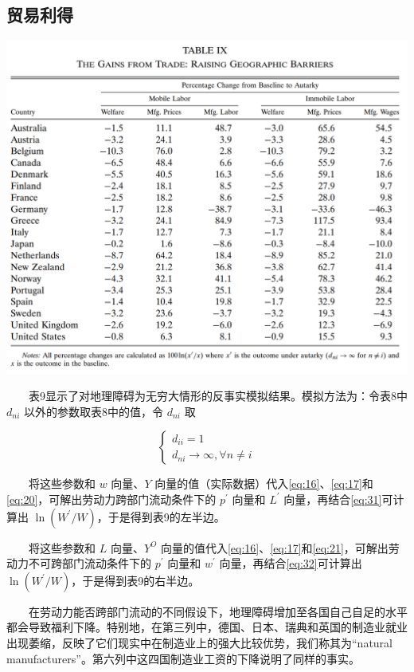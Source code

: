 \documentclass[]{article}
\begin{document}
\hypertarget{section-27}{%
\subsection{贸易利得}\label{section-27}}

\begin{center}\includegraphics[width=1\linewidth]{Figures/Table9} \end{center}

　　表9显示了对地理障碍为无穷大情形的反事实模拟结果。模拟方法为：令表8中 \(d_{ni}\) 以外的参数取表8中的值，令 \(d_{ni}\) 取

\[
\left\{\begin{array}{c}{d_{i i}=1} \\ {d_{n i}\rightarrow \infty, \forall n \neq i}\end{array}\right.
\]

　　将这些参数和 \(w\) 向量、\(Y\) 向量的值（实际数据）代入\eqref{eq:16}、\eqref{eq:17}和\eqref{eq:20}，可解出劳动力跨部门流动条件下的 \(p^{\prime}\) 向量和 \(L^{\prime}\) 向量，再结合\eqref{eq:31}可计算出 \(\ln \left(W^{\prime}/W\right)\)，于是得到表9的左半边。

　　将这些参数和 \(L\) 向量、\(Y^O\) 向量的值代入\eqref{eq:16}、\eqref{eq:17}和\eqref{eq:21}，可解出劳动力不可跨部门流动条件下的 \(p^{\prime}\) 向量和 \(w^{\prime}\) 向量，再结合\eqref{eq:32}可计算出 \(\ln \left(W^{\prime}/W\right)\)，于是得到表9的右半边。

　　在劳动力能否跨部门流动的不同假设下，地理障碍增加至各国自己自足的水平都会导致福利下降。特别地，在第三列中，德国、日本、瑞典和英国的制造业就业出现萎缩，反映了它们现实中在制造业上的强大比较优势，我们称其为``natural manufacturers''。第六列中这四国制造业工资的下降说明了同样的事实。
\end{document}
